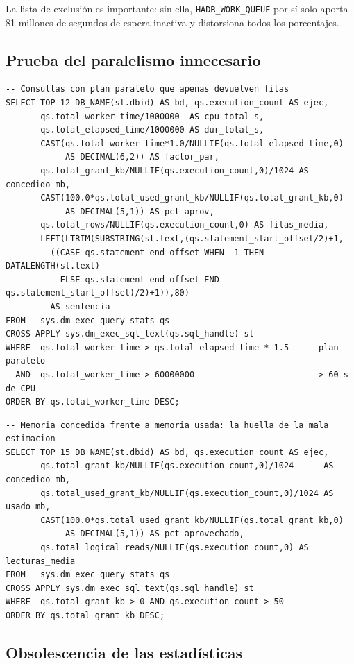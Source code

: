 \documentclass[11pt,a4paper]{article}
\newcommand{\cod}[1]{\texttt{\small #1}}
\begin{document}
\noindent La lista de exclusión es importante: sin ella,
\cod{HADR\_WORK\_QUEUE} por sí solo aporta 81 millones de segundos de espera
inactiva y distorsiona todos los porcentajes.

\subsection{Prueba del paralelismo innecesario}

\begin{lstlisting}[style=sql]
-- Consultas con plan paralelo que apenas devuelven filas
SELECT TOP 12 DB_NAME(st.dbid) AS bd, qs.execution_count AS ejec,
       qs.total_worker_time/1000000  AS cpu_total_s,
       qs.total_elapsed_time/1000000 AS dur_total_s,
       CAST(qs.total_worker_time*1.0/NULLIF(qs.total_elapsed_time,0)
            AS DECIMAL(6,2)) AS factor_par,
       qs.total_grant_kb/NULLIF(qs.execution_count,0)/1024 AS concedido_mb,
       CAST(100.0*qs.total_used_grant_kb/NULLIF(qs.total_grant_kb,0)
            AS DECIMAL(5,1)) AS pct_aprov,
       qs.total_rows/NULLIF(qs.execution_count,0) AS filas_media,
       LEFT(LTRIM(SUBSTRING(st.text,(qs.statement_start_offset/2)+1,
         ((CASE qs.statement_end_offset WHEN -1 THEN DATALENGTH(st.text)
           ELSE qs.statement_end_offset END - qs.statement_start_offset)/2)+1)),80)
         AS sentencia
FROM   sys.dm_exec_query_stats qs
CROSS APPLY sys.dm_exec_sql_text(qs.sql_handle) st
WHERE  qs.total_worker_time > qs.total_elapsed_time * 1.5   -- plan paralelo
  AND  qs.total_worker_time > 60000000                      -- > 60 s de CPU
ORDER BY qs.total_worker_time DESC;
\end{lstlisting}

\begin{lstlisting}[style=sql]
-- Memoria concedida frente a memoria usada: la huella de la mala estimacion
SELECT TOP 15 DB_NAME(st.dbid) AS bd, qs.execution_count AS ejec,
       qs.total_grant_kb/NULLIF(qs.execution_count,0)/1024      AS concedido_mb,
       qs.total_used_grant_kb/NULLIF(qs.execution_count,0)/1024 AS usado_mb,
       CAST(100.0*qs.total_used_grant_kb/NULLIF(qs.total_grant_kb,0)
            AS DECIMAL(5,1)) AS pct_aprovechado,
       qs.total_logical_reads/NULLIF(qs.execution_count,0) AS lecturas_media
FROM   sys.dm_exec_query_stats qs
CROSS APPLY sys.dm_exec_sql_text(qs.sql_handle) st
WHERE  qs.total_grant_kb > 0 AND qs.execution_count > 50
ORDER BY qs.total_grant_kb DESC;
\end{lstlisting}

\subsection{Obsolescencia de las estadísticas}
\end{document}
